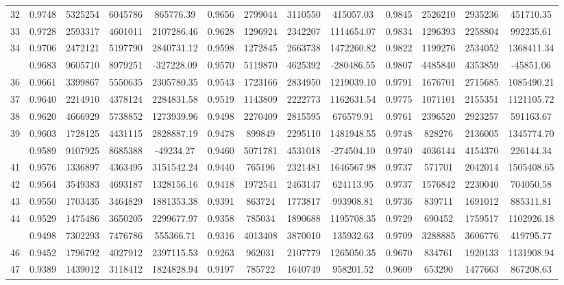 \documentclass[
  12pt,
]{article}
\begin{document}
\begin{longtable}[t]{lcccccccccccc}
32 & 0.9748 & 5325254 & 6045786 & 865776.39 & 0.9656 & 2799044 & 3110550 & 415057.03 & 0.9845 & 2526210 & 2935236 & 451710.35\\
33 & 0.9728 & 2593317 & 4601011 & 2107286.46 & 0.9628 & 1296924 & 2342207 & 1114654.07 & 0.9834 & 1296393 & 2258804 & 992235.61\\
34 & 0.9706 & 2472121 & 5197790 & 2840731.12 & 0.9598 & 1272845 & 2663738 & 1472260.82 & 0.9822 & 1199276 & 2534052 & 1368411.34\\
\addlinespace
35 & 0.9683 & 9605710 & 8979251 & -327228.09 & 0.9570 & 5119870 & 4625392 & -280486.55 & 0.9807 & 4485840 & 4353859 & -45851.06\\
36 & 0.9661 & 3399867 & 5550635 & 2305780.35 & 0.9543 & 1723166 & 2834950 & 1219039.10 & 0.9791 & 1676701 & 2715685 & 1085490.21\\
37 & 0.9640 & 2214910 & 4378124 & 2284831.58 & 0.9519 & 1143809 & 2222773 & 1162631.54 & 0.9775 & 1071101 & 2155351 & 1121105.72\\
38 & 0.9620 & 4666929 & 5738852 & 1273939.96 & 0.9498 & 2270409 & 2815595 & 676579.91 & 0.9761 & 2396520 & 2923257 & 591163.67\\
39 & 0.9603 & 1728125 & 4431115 & 2828887.19 & 0.9478 & 899849 & 2295110 & 1481948.55 & 0.9748 & 828276 & 2136005 & 1345774.70\\
\addlinespace
40 & 0.9589 & 9107925 & 8685388 & -49234.27 & 0.9460 & 5071781 & 4531018 & -274504.10 & 0.9740 & 4036144 & 4154370 & 226144.34\\
41 & 0.9576 & 1336897 & 4363495 & 3151542.24 & 0.9440 & 765196 & 2321481 & 1646567.98 & 0.9737 & 571701 & 2042014 & 1505408.65\\
42 & 0.9564 & 3549383 & 4693187 & 1328156.16 & 0.9418 & 1972541 & 2463147 & 624113.95 & 0.9737 & 1576842 & 2230040 & 704050.58\\
43 & 0.9550 & 1703435 & 3464829 & 1881353.38 & 0.9391 & 863724 & 1773817 & 993908.81 & 0.9736 & 839711 & 1691012 & 885311.81\\
44 & 0.9529 & 1475486 & 3650205 & 2299677.97 & 0.9358 & 785034 & 1890688 & 1195708.35 & 0.9729 & 690452 & 1759517 & 1102926.18\\
\addlinespace
45 & 0.9498 & 7302293 & 7476786 & 555366.71 & 0.9316 & 4013408 & 3870010 & 135932.63 & 0.9709 & 3288885 & 3606776 & 419795.77\\
46 & 0.9452 & 1796792 & 4027912 & 2397115.53 & 0.9263 & 962031 & 2107779 & 1265050.35 & 0.9670 & 834761 & 1920133 & 1131908.94\\
47 & 0.9389 & 1439012 & 3118412 & 1824828.94 & 0.9197 & 785722 & 1640749 & 958201.52 & 0.9609 & 653290 & 1477663 & 867208.63\\

\end{longtable}
\end{document}
